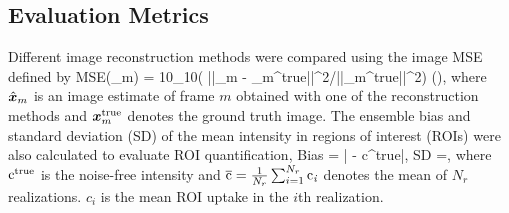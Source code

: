 \documentclass[]{IEEETran}
\begin{document}
	\subsection{Evaluation Metrics}
	
	Different image reconstruction methods were compared using the image MSE defined by
	\beq
	{\rm MSE}(\hat{\x}_m) = 10\log_{10}\big( ||\hat{\x}_m - \x_m^{\rm{true}}||^2/||\x_m^{\rm{true}}||^2\big) (),
	\eeq
	where $\hat{\bm{x}}_m$ is an image estimate of frame $m$ obtained with one of the reconstruction methods and $\bm{x}_m^{\rm{true}}$ denotes the ground truth image. The ensemble bias and standard deviation (SD) of the mean intensity in regions of
	interest (ROIs) were also calculated to evaluate ROI quantification,
	\beq
	\rm{Bias} = \big| - \rm{c}^{\rm{true}}\big|,\;
	{\rm SD} =,
	\eeq
	where $\rm{c}^{\rm{true}}$ is the noise-free intensity and $\overline{\rm{c}}=\frac{1}{N_r}\sum_{i=1}^{N_r}\rm{c}_{\it{i}}$ denotes the mean of $N_r$ realizations. $c_i$ is the mean ROI uptake in the $i$th realization. %
	
	
	
\end{document}
